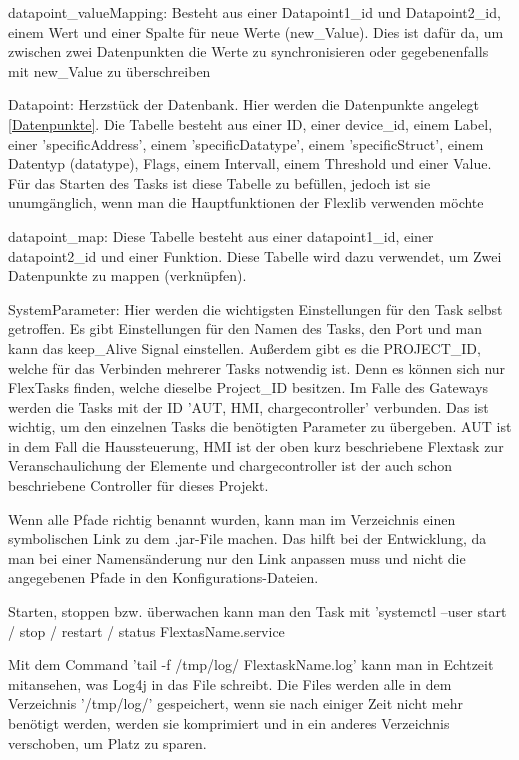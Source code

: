 \begin{compactenum}
\begin{compactenum}
        \item datapoint\_valueMapping: Besteht aus einer Datapoint1\_id und Datapoint2\_id, einem Wert und einer Spalte für neue Werte (new\_Value). Dies ist dafür da, um zwischen zwei Datenpunkten die Werte zu synchronisieren oder gegebenenfalls mit new\_Value zu überschreiben
        \item Datapoint: Herzstück der Datenbank. Hier werden die Datenpunkte angelegt \ref{Datenpunkte}. Die Tabelle besteht aus einer ID, einer device\_id, einem Label, einer 'specificAddress', einem 'specificDatatype', einem 'specificStruct', einem Datentyp (datatype), Flags, einem Intervall, einem Threshold und einer Value. Für das Starten des Tasks ist diese Tabelle zu befüllen, jedoch ist sie unumgänglich, wenn man die Hauptfunktionen der Flexlib verwenden möchte
        \item datapoint\_map: Diese Tabelle besteht aus einer datapoint1\_id, einer datapoint2\_id und einer Funktion. Diese Tabelle wird dazu verwendet, um Zwei Datenpunkte zu mappen (verknüpfen).
        \item SystemParameter: Hier werden die wichtigsten Einstellungen für den Task selbst getroffen. Es gibt Einstellungen für den Namen des Tasks, den Port und man kann das keep\_Alive Signal einstellen. Außerdem gibt es die PROJECT\_ID, welche für das Verbinden mehrerer Tasks notwendig ist. Denn es können sich nur FlexTasks finden, welche dieselbe Project\_ID besitzen. Im Falle des Gateways werden die Tasks mit der ID 'AUT, HMI, chargecontroller' verbunden. Das ist wichtig, um den einzelnen Tasks die benötigten Parameter zu übergeben. AUT ist in dem Fall die Haussteuerung, HMI ist der oben kurz beschriebene Flextask zur Veranschaulichung der Elemente und chargecontroller ist der auch schon beschriebene Controller für dieses Projekt.
    \end{compactenum}
    \item Wenn alle Pfade richtig benannt wurden, kann man im Verzeichnis einen symbolischen Link zu dem .jar-File machen. Das hilft bei der Entwicklung, da man bei einer Namensänderung nur den Link anpassen muss und nicht die angegebenen Pfade in den Konfigurations-Dateien.
    \item Starten, stoppen bzw. überwachen kann man den Task mit 'systemctl --user start / stop / restart / status FlextasName.service
    \item Mit dem Command 'tail -f /tmp/log/ FlextaskName.log' kann man in Echtzeit mitansehen, was Log4j in das File schreibt. Die Files werden alle in dem Verzeichnis '/tmp/log/' gespeichert, wenn sie nach einiger Zeit nicht mehr benötigt werden, werden sie komprimiert und in ein anderes Verzeichnis verschoben, um Platz zu sparen.
\end{compactenum}
